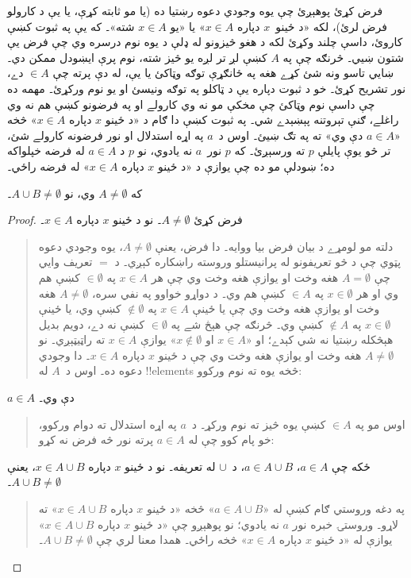 \documentclass[../../../include/open-logic-section]{subfiles}
\begin{document}
فرض کړئ پوهېږئ چې يوه وجودي دعوه
رښتيا ده (يا مو ثابته کړې، يا يې
د کارولو فرض لرئ)، لکه «د ځينو~$x$
دپاره $x \in A$» يا «يو
$x \in A$ شته»۔ که يې په ثبوت
کښې کاروئ، داسې چلند وکړئ لکه
د هغو څيزونو له ډلې د يوه نوم
درسره وي چې فرض يې شتون ښيي۔
څرنګه چې په $A$ کښې لږ تر لږه
يو څيز شته، نوم پرې ايښودل
ممکن دي۔ ښايي تاسو ونه شئ
کړے هغه په ځانګړې توګه
وټاکئ يا يې، له دې پرته چې
$\in A$ دے، نور تشريح کړئ۔
خو د ثبوت دپاره يې د ټاکلو
په توګه ونيسئ او يو نوم
ورکړئ۔ مهمه ده چې داسې نوم
وټاکئ چې مخکې مو نه وي
کارولے او په فرضونو کښې
هم نه وي راغلے، ګنې تېروتنه
پېښېدے شي۔ په ثبوت کښې دا
ګام د «د ځينو $x$ دپاره
$x \in A$» څخه «$a
\in A$ دې وي» ته په تګ
ښيئ۔ اوس د~$a$ په اړه
استدلال او نور فرضونه
کارولے شئ، تر څو يوې
پايلې $p$ ته ورسېږئ۔
که $p$ نور~$a$ نه يادوي،
نو $p$ د $a \in A$
له فرضه خپلواکه ده؛ ښودلې
مو ده چې يوازې د «د ځينو
$x$ دپاره $x \in A$»
له فرضه راځي۔

\begin{prop}
که $A \neq \emptyset$ وي، نو
$A \cup B \neq \emptyset$۔
\end{prop}

\begin{proof}
  فرض کړئ $A \neq \emptyset$۔
  نو د ځينو $x$ دپاره $x \in A$۔
  \begin{quote}
    دلته مو لومړے د بيان
    فرض بيا ووايه۔ دا فرض،
    يعنې $A \neq \emptyset$،
    يوه وجودي دعوه پټوي
    چې د څو تعريفونو له
    پرانيستلو وروسته
    راښکاره کېږي۔ د $=$
    تعريف وايي چې $A = \emptyset$
    هغه وخت او يوازې هغه
    وخت وي چې هر $x \in A$
    په $\in \emptyset$ کښې
    هم وي او هر $x \in
    \emptyset$ په $\in A$
    کښې هم وي۔ د دواړو
    خواوو په نفي سره،
    $A \neq
    \emptyset$ هغه وخت او
    يوازې هغه وخت وي چې
    يا ځينې $x \in A$ په
    $\notin \emptyset$ کښې وي،
    يا ځينې $x \in \emptyset$
    په $\notin A$ کښې وي۔
    څرنګه چې هېڅ شے په
    $\in \emptyset$ کښې نه
    دے، دويم بديل هېڅکله
    رښتيا نه شي کېدے؛ او
    «$x \in A$ او $x
    \notin \emptyset$» يوازې
    $x \in A$ ته راټيټېږي۔
    نو $A \neq
    \emptyset$ هغه وخت او
    يوازې هغه وخت وي چې
    د ځينو $x$ دپاره $x \in A$۔
    دا وجودي دعوه ده۔
    اوس د~$A$ له
    !!{element}s څخه
    يوه ته نوم ورکوو:
  \end{quote}
  $a \in A$ دې وي۔
  \begin{quote}
    اوس مو په $\in A$
    کښې يوه څيز ته نوم
    ورکړ۔ د~$a$ په
    اړه استدلال ته دوام
    ورکوو، خو پام کوو چې
    له $a \in A$ پرته
    نور څه فرض نه کړو:
  \end{quote}
  ځکه چې $a \in A$،
  $a \in A \cup B$،
  د~$\cup$ له تعريفه۔
  نو د ځينو $x$ دپاره
  $x \in A \cup B$،
  يعنې $A \cup B \neq \emptyset$۔
  \begin{quote}
    په دغه وروستي ګام
    کښې له «$a \in A \cup B$»
    څخه «د ځينو $x$
    دپاره $x \in A \cup B$»
    ته لاړو۔ وروستۍ
    خبره نور $a$ نه يادوي؛
    نو پوهېږو چې «د ځينو
    $x$ دپاره $x \in A \cup B$»
    يوازې له «د ځينو
    $x$ دپاره $x \in A$»
    څخه راځي۔ همدا معنا
    لري چې $A \cup B \neq
    \emptyset$۔
  \end{quote}
\end{proof}
\end{document}
